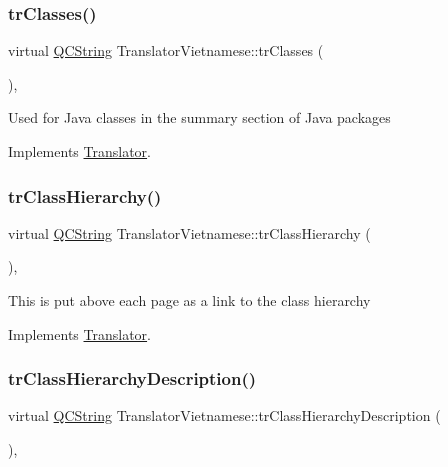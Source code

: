 \subsubsection{\texorpdfstring{trClasses()}{trClasses()}}
{\footnotesize\ttfamily virtual \mbox{\hyperlink{class_q_c_string}{Q\+C\+String}} Translator\+Vietnamese\+::tr\+Classes (\begin{DoxyParamCaption}{ }\end{DoxyParamCaption})\hspace{0.3cm}{\ttfamily [inline]}, {\ttfamily [virtual]}}

Used for Java classes in the summary section of Java packages 

Implements \mbox{\hyperlink{class_translator}{Translator}}.

\mbox{\label{class_translator_vietnamese_a119627f8b75b362852ba560671301ecc}} 
\subsubsection{\texorpdfstring{trClassHierarchy()}{trClassHierarchy()}}
{\footnotesize\ttfamily virtual \mbox{\hyperlink{class_q_c_string}{Q\+C\+String}} Translator\+Vietnamese\+::tr\+Class\+Hierarchy (\begin{DoxyParamCaption}{ }\end{DoxyParamCaption})\hspace{0.3cm}{\ttfamily [inline]}, {\ttfamily [virtual]}}

This is put above each page as a link to the class hierarchy 

Implements \mbox{\hyperlink{class_translator}{Translator}}.

\mbox{\label{class_translator_vietnamese_a2baec0ed85d8c1da81f98c808389e86f}} 
\subsubsection{\texorpdfstring{trClassHierarchyDescription()}{trClassHierarchyDescription()}}
{\footnotesize\ttfamily virtual \mbox{\hyperlink{class_q_c_string}{Q\+C\+String}} Translator\+Vietnamese\+::tr\+Class\+Hierarchy\+Description (\begin{DoxyParamCaption}{ }\end{DoxyParamCaption})\hspace{0.3cm}{\ttfamily [inline]}, {\ttfamily [virtual]}}

